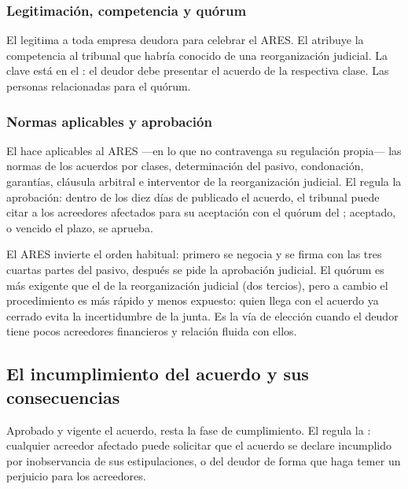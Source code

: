 \subsubsection{Legitimación, competencia y quórum}

El  legitima a toda empresa deudora para celebrar el ARES. El  atribuye la
competencia al tribunal que habría conocido de una reorganización judicial. La clave está en el
: el deudor debe presentar el acuerdo  de la respectiva clase. Las personas
relacionadas  para el quórum.

\subsubsection{Normas aplicables y aprobación}

El  hace aplicables al ARES ---en lo que no contravenga su regulación propia--- las
normas de los acuerdos por clases, determinación del pasivo, condonación, garantías, cláusula
arbitral e interventor de la reorganización judicial. El  regula la aprobación: dentro
de los diez días de publicado el acuerdo, el tribunal puede citar a los acreedores afectados
para su aceptación con el quórum del ; aceptado, o vencido el plazo, se aprueba.

\begin{foco}
El ARES invierte el orden habitual: primero se negocia y se firma con las tres cuartas partes
del pasivo, después se pide la aprobación judicial. El quórum es más exigente que el de la
reorganización judicial (dos tercios), pero a cambio el procedimiento es más rápido y menos
expuesto: quien llega con el acuerdo ya cerrado evita la incertidumbre de la junta. Es la vía de
elección cuando el deudor tiene pocos acreedores financieros y relación fluida con ellos.
\end{foco}

\subsection{El incumplimiento del acuerdo y sus consecuencias}

Aprobado y vigente el acuerdo, resta la fase de cumplimiento. El  regula la
: cualquier acreedor afectado puede solicitar que el acuerdo
se declare incumplido por inobservancia de sus estipulaciones, o  del deudor de forma que haga temer un perjuicio para los acreedores.

